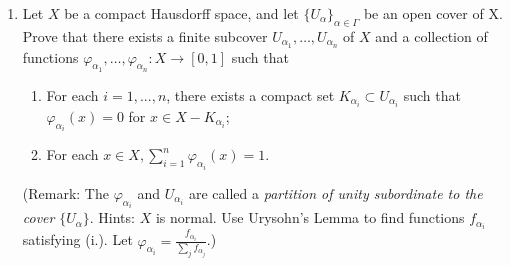 \documentclass[letterpaper]{article}
\begin{document}
\begin{enumerate}
\begin{proof}
Let $X$ be a normal space, with $A,B$ disjoint closed subsets of $X$. We will prove that there exists a continuous function $\varphi: X \to [0,1]$ such that $\varphi(a)=0$ for all $a \in A$, and $\varphi(b)=1$ for all $b \in B$.

Let $S = A \cup B$. Let $f:S\to \R$ be 
\[\begin{array}{rr}
f(a) = 0 & \forall a\in A\\
f(b) = 1 & \forall b\in B.\\
\end{array}\]
Now, $f|_A$, $f|_B$ are constant functions on compact domains, so they are continuous. Thus, by the Piecing Lemma, $f$ is continuous. Now, by Tietze's Extension Theorem, there exists a continuous function $F:X\to \R$ such that $f(x)=F(x)$ for all $x\in S$. 

Now, define $\varphi: X \to [0,1]$ by 
$$\varphi(x)=
\begin{cases}
0 & F(x)\leq 0\\
F(x) & F(x)\in[0,1]\\
1 & F(x)\geq 1\\
\end{cases}_.$$
Note that since $F$ is continuous, $\preimage{F}{(-\infty, 0]}$ and $\preimage{F}{[1,\infty)}$ are closed. So, since $\varphi$ is constant on the above closed sets, it is continuous on them, and it is equivalent to the continuous function $F$ on $[0,1]$. Thus, by the Piecing Lemma, $\varphi$ is continuous. Therefore, we have shown that there exists continuous $\varphi: X \to [0,1]$ such that $\varphi(a)=0$ for all $a \in A$, and $\varphi(b)=1$ for all $b \in B$.
\end{proof}

\item Let $X$ be a compact Hausdorff space, and let ${\{U_\alpha\}_{\alpha\in\Gamma}}$ be an open cover of X. Prove that there exists a finite subcover $U_{\alpha_1}, \ldots, U_{\alpha_n}$ of $X$ and a collection of functions $\varphi_{\alpha_1}, \ldots, \varphi_{\alpha_n}: X \to [0,1]$ such that

\begin{enumerate}[label=(\roman*)]
\item For each $i = 1,...,n$, there exists a compact set $K_{\alpha_i} \subset U_{\alpha_i}$ such that $\varphi	_{\alpha_i}(x)=0$ for $x \in X - K_{\alpha_i}$;
\item For each $x\in X, \sum\limits_{i=1}^n \varphi_{\alpha_i}(x) = 1$. 
\end{enumerate}
(Remark: The $\varphi_{\alpha_i}$ and $U_{\alpha_i}$ are called a \emph{partition of unity subordinate to the cover} $\{U_\alpha\}$. Hints: $X$ is normal. Use Urysohn’s Lemma to find functions $f_{\alpha_i}$ satisfying (i.). Let $\varphi_{\alpha_i} = \frac{f_{\alpha_i}}{\sum_j f_{\alpha_j}}$.)


\end{enumerate}
\end{document}
